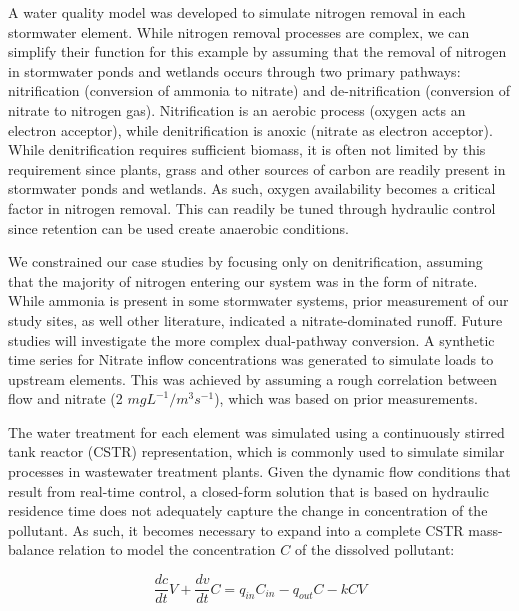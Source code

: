 A water quality model was developed to simulate nitrogen removal in each
stormwater element. While nitrogen removal processes are complex, we can
simplify their function for this example by assuming that the removal of nitrogen in stormwater ponds and wetlands occurs through two primary pathways: nitrification (conversion of ammonia to nitrate) and de-nitrification (conversion of nitrate to nitrogen gas)\cite{Kadlec2008TreatmentWetlands, Reddy1989Nitrification-DenitrificationWetlands}.  Nitrification is an aerobic process (oxygen acts an electron acceptor), while denitrification is anoxic (nitrate as electron acceptor). While denitrification requires sufficient biomass, it is often not limited by this requirement since plants, grass and other sources of carbon are readily present in stormwater ponds and wetlands\cite{White2009BiogeochemicalWetlands}. 
As such, oxygen availability becomes a critical factor in nitrogen removal. This can readily be tuned through hydraulic control since retention can be used create anaerobic conditions. 

We constrained our case studies by focusing only on denitrification, assuming that the majority of nitrogen entering our system was in the form of nitrate. While ammonia is present in some stormwater systems, prior measurement of our study sites, as well other literature\cite{Kadlec2008TreatmentWetlands}, indicated a nitrate-dominated runoff. 
Future studies will investigate the more complex dual-pathway conversion. 
A synthetic time series for Nitrate inflow concentrations was generated to simulate loads to upstream elements. 
This was achieved by assuming a rough correlation between flow and nitrate (2 $mgL^{-1}/m^3s^{-1}$), which was based on prior measurements\cite{Kerkez2016SmarterSystems}.

The water treatment for each element was simulated using a continuously stirred tank reactor (CSTR) representation, which is commonly used to simulate similar processes in wastewater treatment plants\cite{Henze2000ActivatedASM3}.
Given the dynamic flow conditions that result from real-time control, a closed-form solution that is based on hydraulic residence time does not adequately capture the change in concentration of the pollutant.
As such, it becomes necessary to expand into a complete CSTR mass-balance relation\cite{Alvord1996AtrazineWetlands,Kadlec2001PhosphorusWetlands,Munson2002ModelArea} to model the concentration $C$ of the dissolved pollutant:

\begin{equation} \label{cstr}
  \frac{dc}{dt}  V + \frac{dv}{dt}  C = q_{in}  C_{in} - q_{out}  C - k  C  V
\end{equation}

